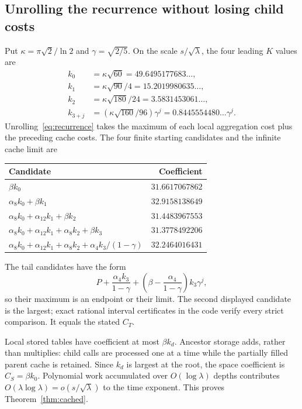 \documentclass[11pt,letterpaper]{article}
\theoremstyle{remark}\newtheorem{remark}[theorem]{Remark}
\begin{document}
\subsection{Unrolling the recurrence without losing child costs}

Put $\kappa=\pi\sqrt2/\ln2$ and $\gamma=\sqrt{2/5}$. On the scale
$s/\sqrt\lambda$, the four leading $K$ values are
\begin{align*}
 k_0&=\kappa\sqrt{60}=49.6495177683\ldots,\\
 k_1&=\kappa\sqrt{90}/4=15.2019980635\ldots,\\
 k_2&=\kappa\sqrt{180}/24=3.5831453061\ldots,\\
 k_{3+j}&=(\kappa\sqrt{160}/96)\gamma^j
             =0.8445554480\ldots\gamma^j.
\end{align*}
Unrolling~\eqref{eq:recurrence} takes the maximum of each local
aggregation cost plus the preceding cache costs. The four finite starting
candidates and the infinite cache limit are
\begin{center}
\begin{tabular}{@{}lr@{}}
\toprule Candidate & Coefficient\\\midrule
$\beta k_0$ & $31.6617067862$\\
$\alpha_8k_0+\beta k_1$ & $32.9158138649$\\
$\alpha_8k_0+\alpha_{12}k_1+\beta k_2$ & $31.4483967553$\\
$\alpha_8k_0+\alpha_{12}k_1+\alpha_8k_2+\beta k_3$
 & $31.3778492206$\\
$\alpha_8k_0+\alpha_{12}k_1+\alpha_8k_2+
       \alpha_4 k_3/(1-\gamma)$ & $32.2464016431$\\
\bottomrule
\end{tabular}
\end{center}
The tail candidates have the form
\[
 P+\frac{\alpha_4 k_3}{1-\gamma}
 +\left(\beta-\frac{\alpha_4}{1-\gamma}\right)k_3\gamma^j,
\]
so their maximum is an endpoint or their limit. The second displayed
candidate is the largest; exact rational interval certificates in the
code verify every strict comparison. It equals the stated $C_T$.

Local stored tables have coefficient at most $\beta k_d$.
Ancestor storage adds, rather than multiplies: child calls are processed
one at a time while the partially filled parent cache is retained. Since
$k_d$ is largest at the root, the space coefficient is $C_S=\beta k_0$.
Polynomial work accumulated over $O(\log\lambda)$ depths contributes
$O(\lambda\log\lambda)=o(s/\sqrt\lambda)$ to the time exponent. This
proves Theorem~\ref{thm:cached}.
\end{document}
